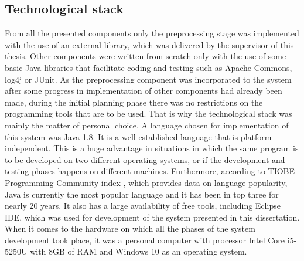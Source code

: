 \subsection{Technological stack}
From all the presented components only the preprocessing stage was implemented with the use of an external library, which was delivered by the supervisor of this thesis. Other components were written from scratch only with the use of some basic Java libraries that facilitate coding and testing such as Apache Commons, log4j or JUnit. As the preprocessing component was incorporated to the system after some progress in implementation of other components had already been made, during the initial planning phase there was no restrictions on the programming tools that are to be used. That is why the technological stack was mainly the matter of personal choice. A language chosen for implementation of this system was Java 1.8. It is a well established language that is platform independent. This is a huge advantage in situations in which the same program is to be developed on two different operating systems, or if the development and testing phases happens on different machines. Furthermore, according to TIOBE Programming Community index \cite{tiobe}, which provides data on language popularity, Java is currently the most popular language and it has been in top three for nearly 20 years. It also has a large availability of free tools, including Eclipse IDE, which was used for development of the system presented in this dissertation. 
When it comes to the hardware on which all the phases of the system development took place, it was a personal computer with processor Intel Core i5-5250U with 8GB of RAM and Windows 10 as an operating system.





